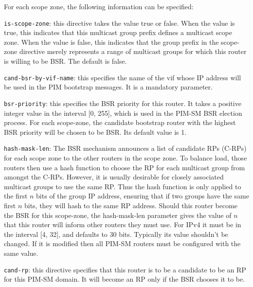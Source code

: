 \begin{description}
\begin{description}
\begin{description}
  For each scope zone, the following information can be specified: 
\begin{description}
\item{\tt is-scope-zone}: this directive takes the value {\stt true}
  or {\stt false}.  When the value is {\stt true}, this indicates that
  this multicast group prefix defines a multicast scope zone.  When
  the value is {\stt false}, this indicates that the group prefix in
  the {\stt scope-zone} directive merely represents a range of
  multicast groups for which this router is willing to be BSR.  The
  default is {\stt false}.
\item{\tt cand-bsr-by-vif-name}: this specifies the name of the {\stt
  vif} whose IP address will be used in the PIM bootstrap messages.  It
  is a mandatory parameter.
\item{\tt bsr-priority}: this specifies the BSR priority for this
  router.  It takes a positive integer value in the interval [0, 255],
  which is used in the
  PIM-SM BSR election process.  For each {\stt scope-zone}, the
  candidate bootstrap router with the highest BSR priority will be
  chosen to be BSR. Its default value is 1.
\item{\tt hash-mask-len}: The BSR mechanism announces a list of
  candidate RPs (C-RPs) for each scope zone to the other routers in
  the scope zone.  To balance load, those routers then use a hash
  function to choose the RP for each multicast group from amongst the
  C-RPs.  However, it is usually desirable for closely associated
  multicast groups to use the same RP.  Thus the hash function is only
  applied to the first $n$ bits of the group IP address, ensuring that
  if two groups have the same first $n$ bits, they will hash to the
  same RP address.  Should this router become the BSR for this
  scope-zone, the {\stt hash-mask-len} parameter gives the value of
  $n$ that this router will inform other routers they must use.
  For IPv4 it must be in the interval [4, 32], and defaults to 30 bits.
  Typically its value shouldn't be changed.
  If it is modified then all PIM-SM routers must be configured with the
  same value.
\end{description}
\end{description}
\end{description}
\item{\tt cand-rp}: this directive specifies that this router is to be
  a candidate to be an RP for this PIM-SM domain.  It will become an
  RP only if the BSR chooses it to be.  


\end{description}
